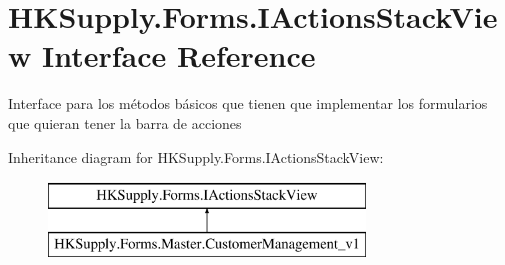 \hypertarget{interface_h_k_supply_1_1_forms_1_1_i_actions_stack_view}{}\section{H\+K\+Supply.\+Forms.\+I\+Actions\+Stack\+View Interface Reference}
\label{interface_h_k_supply_1_1_forms_1_1_i_actions_stack_view}


Interface para los métodos básicos que tienen que implementar los formularios que quieran tener la barra de acciones  


Inheritance diagram for H\+K\+Supply.\+Forms.\+I\+Actions\+Stack\+View\+:\begin{figure}[H]
\begin{center}
\leavevmode
\includegraphics[height=2.000000cm]{interface_h_k_supply_1_1_forms_1_1_i_actions_stack_view}
\end{center}
\end{figure}
